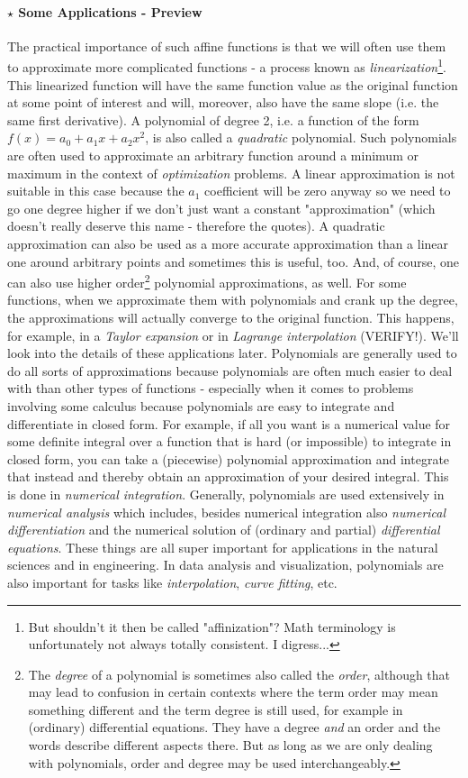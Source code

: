 \paragraph{$\star$ Some Applications - Preview}
The practical importance of such affine functions is that we will often use them to approximate more complicated functions - a process known as \emph{linearization}\footnote{But shouldn't it then be called "affinization"? Math terminology is unfortunately not always totally consistent. I digress...}. This linearized function will have the same function value as the original function at some point of interest and will, moreover, also have the same slope (i.e. the same first derivative). A polynomial of degree 2, i.e. a function of the form $f(x) = a_0 + a_1 x + a_2 x^2$, is also called a \emph{quadratic} polynomial. Such polynomials are often used to approximate an arbitrary function around a minimum or maximum in the context of \emph{optimization} problems. A linear approximation is not suitable in this case because the $a_1$ coefficient will be zero anyway so we need to go one degree higher if we don't just want a constant "approximation" (which doesn't really deserve this name - therefore the quotes). A quadratic approximation can also be used as a more accurate approximation than a linear one around arbitrary points and sometimes this is useful, too. And, of course, one can also use higher order\footnote{The \emph{degree} of a polynomial is sometimes also called the \emph{order}, although that may lead to confusion in certain contexts where the term order may mean something different and the term degree is still used, for example in (ordinary) differential equations. They have a degree \emph{and} an order and the words describe different aspects there. But as long as we are only dealing with polynomials, order and degree may be used interchangeably.} polynomial approximations, as well. For some functions, when we approximate them with polynomials and crank up the degree, the approximations will actually converge to the original function. This happens, for example, in a \emph{Taylor expansion} or in \emph{Lagrange interpolation} (VERIFY!). We'll look into the details of these applications later. Polynomials are generally used to do all sorts of approximations because polynomials are often much easier to deal with than other types of functions - especially when it comes to problems involving some calculus because polynomials are easy to integrate and differentiate in closed form. For example, if all you want is a numerical value for some definite integral over a function that is hard (or impossible) to integrate in closed form, you can take a (piecewise) polynomial approximation and integrate that instead and thereby obtain an approximation of your desired integral. This is done in \emph{numerical integration}. Generally, polynomials are used extensively in \emph{numerical analysis} which includes, besides numerical integration also \emph{numerical differentiation} and the numerical solution of (ordinary and partial) \emph{differential equations}. These things are all super important for applications in the natural sciences and in engineering. In data analysis and visualization, polynomials are also important for tasks like \emph{interpolation}, \emph{curve fitting}, etc.


